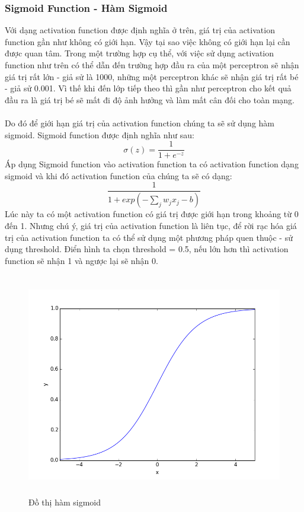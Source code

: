 \subsubsection{Sigmoid Function - Hàm Sigmoid}
Với dạng activation function được định nghĩa ở trên, giá trị của activation 
function gần như không có giới hạn. Vậy tại sao việc không có giới hạn lại 
cần được quan tâm. Trong một trường hợp cụ thể, với việc sử dụng activation 
function như trên có thể dẫn đến trường hợp đầu ra của một perceptron sẽ nhận 
giá trị rất lớn - giả sử là 1000, những một perceptron khác sẽ nhận giá trị rất 
bé - giả sử 0.001. Vì thế khi đến lớp tiếp theo thì gần như perceptron cho kết 
quả đầu ra là giá trị bé sẽ mất đi độ ảnh hưởng và làm mất cân đối cho toàn mạng.\\\\
Do đó để giới hạn giá trị của activation function chúng ta sẽ sử dụng hàm sigmoid. 
Sigmoid function được định nghĩa như sau:\\
\[
  \sigma(z)=\frac{1}{1+e^{-z}}
\]
Áp dụng Sigmoid function vào activation function ta có activation function dạng
sigmoid và khi đó activation function của chúng ta sẽ có dạng:\\
\[
  \frac{1}{1+exp(-\sum_j w_j x_j -b)}
\]
Lúc này ta có một activation function có giá trị được giới hạn trong khoảng 
từ 0 đến 1. Nhưng chú ý, giá trị của activation function là liên tục, để rời 
rạc hóa giá trị của activation function ta có thể sử dụng một phương pháp 
quen thuộc - sử dụng threshold. Điển hình ta chọn threshold = 0.5, nếu lớn hơn 
thì activation function sẽ nhận 1 và ngược lại sẽ nhận 0.\\
\begin{figure}[h!]
\centering
\includegraphics[height=3.85in, keepaspectratio=true]{sigmoid.png}
\caption{Đồ thị hàm sigmoid}
\end{figure}\\
